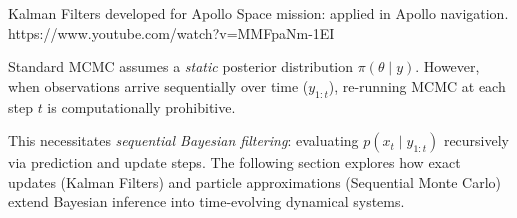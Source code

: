 Kalman Filters developed for Apollo Space mission:  applied in Apollo navigation.
https://www.youtube.com/watch?v=MMFpaNm-1EI




Standard MCMC assumes a \emph{static} posterior distribution $\pi(\theta \mid y)$. However, when observations arrive sequentially over time ($y_{1:t}$), re-running MCMC at each step $t$ is computationally prohibitive. 

\cite{sequentialMCinvitation2022}

This necessitates \emph{sequential Bayesian filtering}: evaluating $p(x_t \mid y_{1:t})$ recursively via prediction and update steps. The following section explores how exact updates (Kalman Filters) and particle approximations (Sequential Monte Carlo) extend Bayesian inference into time-evolving dynamical systems.




\newpage

